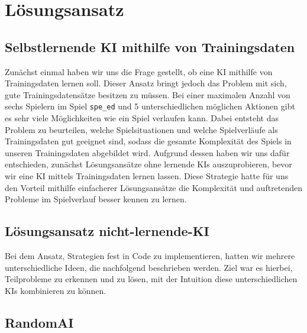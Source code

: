 \chapter{Lösungsansatz}
\label{ch:loesungsansatz}



\section{Selbstlernende KI mithilfe von Trainingsdaten}
\label{sec:selbstlernende-ki-trainingsdaten}

Zunächst einmal haben wir uns die Frage gestellt, ob eine \acs{KI} mithilfe von Trainingsdaten lernen soll.
Dieser Ansatz bringt jedoch das Problem mit sich, gute Trainingsdatensätze besitzen zu müssen.
Bei einer maximalen Anzahl von sechs Spielern im Spiel \texttt{spe\_ed} und 5 unterschiedlichen möglichen Aktionen gibt
es sehr viele Möglichkeiten wie ein Spiel verlaufen kann.
Dabei entsteht das Problem zu beurteilen, welche Spielsituationen und welche Spielverläufe als Trainingsdaten gut
geeignet sind, sodass die gesamte Komplexität des Spiels in unseren Trainingsdaten abgebildet wird.
Aufgrund dessen haben wir uns dafür entschieden, zunächst Lösungsansätze ohne lernende \acs{KI}s auszuprobieren, bevor
wir eine \acs{KI} mittels Trainingsdaten lernen lassen.
Diese Strategie hatte für uns den Vorteil mithilfe einfacherer Lösungsansätze die Komplexität und auftretenden Probleme
im Spielverlauf besser kennen zu lernen.


\section{Lösungsansatz nicht-lernende-KI}
\label{sec:loesungsansatz-nicht-lernende-KI}

Bei dem Ansatz, Strategien fest in Code zu implementieren, hatten wir mehrere unterschiedliche Ideen,
die nachfolgend beschrieben werden.
Ziel war es hierbei, Teilprobleme zu erkennen und zu lösen, mit der Intuition diese unterschiedlichen \acs{KI}s
kombinieren zu können.


\section{RandomAI}
\label{sec:random-ai}

